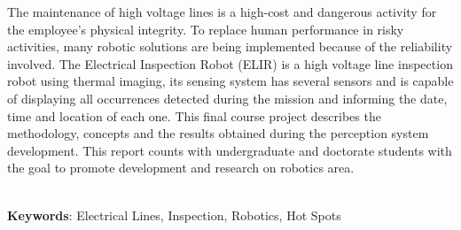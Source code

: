 \begin{thesisabastract}
The maintenance of high voltage lines is a high-cost and dangerous activity for the employee's physical integrity. To replace human performance in risky activities, many robotic solutions are being implemented because of the reliability involved. The  Electrical Inspection Robot (ELIR) is a high voltage line inspection robot using thermal imaging, its sensing system has several sensors and is capable of displaying all occurrences detected during the mission and informing the date, time and location of each one. This final course project describes the methodology, concepts and the results obtained during the perception system development. This report counts with undergraduate and doctorate students with the goal to promote development and research on robotics area.

\ \\


\textbf{Keywords}: Electrical Lines, Inspection, Robotics, Hot Spots

\end{thesisabastract}
